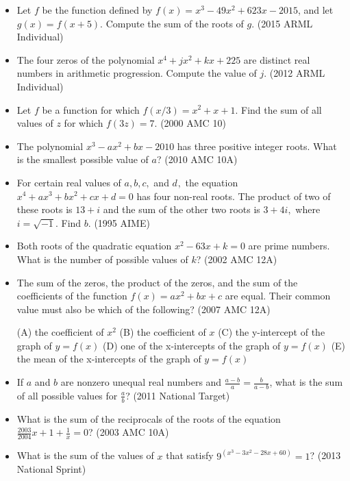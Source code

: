 \documentclass{article}
\begin{document}
\begin{itemize}
\item Let $f$ be the function defined by $f(x)=x^3-49x^2+623x-2015$, and let $g(x)=f(x+5)$. Compute the sum of the roots of $g$. (2015 ARML Individual)

\item The four zeros of the polynomial $x^4+jx^2+kx+225$ are distinct real numbers in arithmetic progression. Compute the value of $j$. (2012 ARML Individual)

\item Let $f$ be a function for which $f(x/3) = x^2 + x + 1$. Find the sum of all values of $z$ for which $f(3z) = 7$. (2000 AMC 10)

\item The polynomial $x^3-ax^2+bx-2010$ has three positive integer roots. What is the smallest possible value of $a$? (2010 AMC 10A)

\item For certain real values of $a, b, c,$ and $d_{},$  the equation $x^4+ax^3+bx^2+cx+d=0$ has four non-real roots.  The product of two of these roots is $13+i$ and the sum of the other two roots is $3+4i,$ where $i=\sqrt{-1}.$  Find $b.$ (1995 AIME)

\item Both roots of the quadratic equation $x^2-63x+k=0$ are prime numbers. What is the number of possible values of $k$? (2002 AMC 12A)

\item The sum of the zeros, the product of the zeros, and the sum of the coefficients of the function $f(x)=ax^{2}+bx+c$ are equal. Their common value must also be which of the following? (2007 AMC 12A)
	
\textrm{(A)} the coefficient of $x^{2}$ 
\textrm{(B)} the coefficient of $x$ 
\textrm{(C)} the y-intercept of the graph of $y=f(x)$  
\textrm{(D)} one of the x-intercepts of the graph of $y=f(x)$ 
\textrm{(E)} the mean of the x-intercepts of the graph of $y=f(x)$ 

\item If $a$ and $b$ are nonzero unequal real numbers and $\frac{a-b}{a}=\frac{b}{a-b}$, what is the sum of all possible values for $\frac{a}{b}$? (2011 National Target)

\item What is the sum of the reciprocals of the roots of the equation $\frac{2003}{2004}x+1+\frac{1}{x}=0$? (2003 AMC 10A)

\item What is the sum of the values of $x$ that satisfy $9^{(x^3-3x^2-28x+60)}=1$? (2013 National Sprint) 

\end{itemize}
\end{document}
